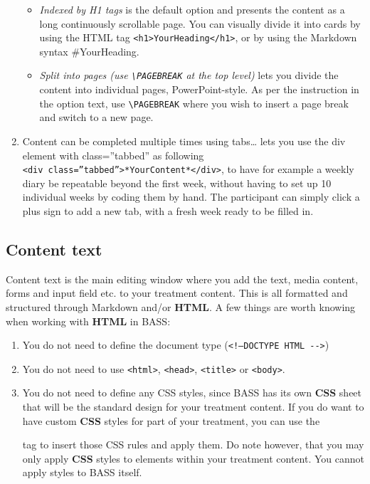 \documentclass[]{book}
\providecommand{\tightlist}{%
  \setlength{\itemsep}{0pt}\setlength{\parskip}{0pt}}
\begin{document}
\begin{enumerate}
  \begin{itemize}
  \tightlist
  \item
    \emph{Indexed by H1 tags} is the default option and presents the content as a long continuously scrollable page. You can visually divide it into cards by using the HTML tag \texttt{\textless{}h1\textgreater{}YourHeading\textless{}/h1\textgreater{}}, or by using the Markdown syntax \#YourHeading.
  \item
    \emph{Split into pages (use \texttt{\textbackslash{}PAGEBREAK} at the top level)} lets you divide the content into individual pages, PowerPoint-style. As per the instruction in the option text, use \texttt{\textbackslash{}PAGEBREAK} where you wish to insert a page break and switch to a new page.
  \end{itemize}
\item
  Content can be completed multiple times using tabs\ldots{} lets you use the div element with class=''tabbed'' as following \texttt{\textless{}div\ class=”tabbed”\textgreater{}*YourContent*\textless{}/div\textgreater{}}, to have for example a weekly diary be repeatable beyond the first week, without having to set up 10 individual weeks by coding them by hand. The participant can simply click a plus sign to add a new tab, with a fresh week ready to be filled in.
\end{enumerate}

\hypertarget{content-text}{%
\subsection{Content text}\label{content-text}}

Content text is the main editing window where you add the text, media content, forms and input field etc. to your treatment content. This is all formatted and structured through Markdown and/or \textbf{HTML}.
A few things are worth knowing when working with \textbf{HTML} in BASS:

\begin{enumerate}
\def\labelenumi{\arabic{enumi}.}
\tightlist
\item
  You do not need to define the document type (\texttt{\textless{}!—DOCTYPE\ HTML\ -\/-\textgreater{}})
\item
  You do not need to use \texttt{\textless{}html\textgreater{}}, \texttt{\textless{}head\textgreater{}}, \texttt{\textless{}title\textgreater{}} or \texttt{\textless{}body\textgreater{}}.
\item
  You do not need to define any CSS styles, since BASS has its own \textbf{CSS} sheet that will be the standard design for your treatment content. If you do want to have custom \textbf{CSS} styles for part of your treatment, you can use the

  tag to insert those CSS rules and apply them. Do note however, that you may only apply \textbf{CSS} styles to elements within your treatment content. You cannot apply styles to BASS itself.
\end{enumerate}
\end{document}
